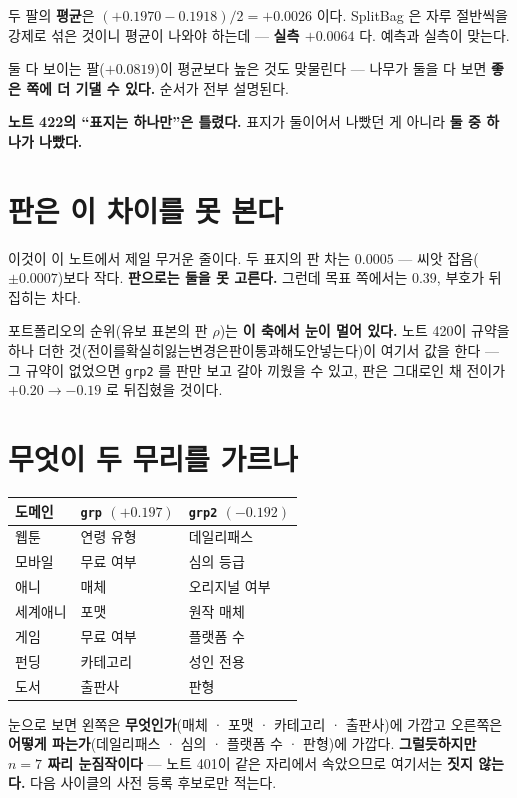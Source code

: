 \documentclass[11pt]{article}
\begin{document}
두 팔의 \textbf{평균}은 $(+0.1970 - 0.1918)/2 = +0.0026$ 이다. SplitBag 은
자루 절반씩을 강제로 섞은 것이니 평균이 나와야 하는데 --- \textbf{실측
$+0.0064$} 다. 예측과 실측이 맞는다.

둘 다 보이는 팔($+0.0819$)이 평균보다 높은 것도 맞물린다 --- 나무가 둘을
다 보면 \textbf{좋은 쪽에 더 기댈 수 있다.} 순서가 전부 설명된다.

\textbf{노트 422의 ``표지는 하나만''은 틀렸다.} 표지가 둘이어서 나빴던 게
아니라 \textbf{둘 중 하나가 나빴다.}

\section{판은 이 차이를 못 본다}

이것이 이 노트에서 제일 무거운 줄이다. 두 표지의 판 차는 $0.0005$ --- 씨앗
잡음($\pm 0.0007$)보다 작다. \textbf{판으로는 둘을 못 고른다.} 그런데 목표
쪽에서는 $0.39$, 부호가 뒤집히는 차다.

포트폴리오의 순위(유보 표본의 판 $\rho$)는 \textbf{이 축에서 눈이 멀어
있다.} 노트 420이 규약을 하나 더한 것($전이를 확실히 잃는 변경은 판이
통과해도 안 넣는다$)이 여기서 값을 한다 --- 그 규약이 없었으면
\texttt{grp2} 를 판만 보고 갈아 끼웠을 수 있고, 판은 그대로인 채 전이가
$+0.20 \to -0.19$ 로 뒤집혔을 것이다.

\section{무엇이 두 무리를 가르나}

\begin{center}
\begin{tabular}{lll}
\hline
도메인 & \texttt{grp} $(+0.197)$ & \texttt{grp2} $(-0.192)$ \\
\hline
웹툰 & 연령 유형 & 데일리패스 \\
모바일 & 무료 여부 & 심의 등급 \\
애니 & 매체 & 오리지널 여부 \\
세계애니 & 포맷 & 원작 매체 \\
게임 & 무료 여부 & 플랫폼 수 \\
펀딩 & 카테고리 & 성인 전용 \\
도서 & 출판사 & 판형 \\
\hline
\end{tabular}
\end{center}

눈으로 보면 왼쪽은 \textbf{무엇인가}(매체 · 포맷 · 카테고리 · 출판사)에
가깝고 오른쪽은 \textbf{어떻게 파는가}(데일리패스 · 심의 · 플랫폼 수 ·
판형)에 가깝다. \textbf{그럴듯하지만 $n{=}7$ 짜리 눈짐작이다} --- 노트 401이
같은 자리에서 속았으므로 여기서는 \textbf{짓지 않는다.} 다음 사이클의
사전 등록 후보로만 적는다.
\end{document}
